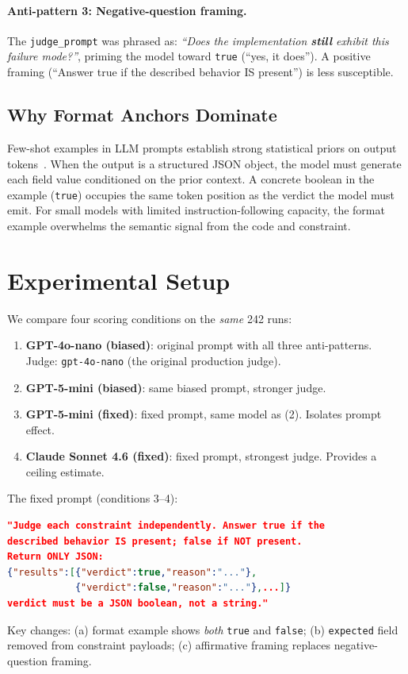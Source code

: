 \documentclass[11pt]{article}
\begin{document}
\paragraph{Anti-pattern 3: Negative-question framing.}
The \texttt{judge\_prompt} was phrased as:
\textit{``Does the implementation \textbf{still} exhibit this failure
mode?''}, priming the model toward \texttt{true} (``yes, it does'').
A positive framing (``Answer true if the described behavior IS present'')
is less susceptible.

\subsection{Why Format Anchors Dominate}

Few-shot examples in LLM prompts establish strong statistical priors on
output tokens~\citep{brown2020language}.
When the output is a structured JSON object, the model must generate each
field value conditioned on the prior context.
A concrete boolean in the example (\texttt{true}) occupies the same
token position as the verdict the model must emit.
For small models with limited instruction-following capacity, the format
example overwhelms the semantic signal from the code and constraint.

\section{Experimental Setup}

We compare four scoring conditions on the \emph{same} 242 runs:

\begin{enumerate}
  \item \textbf{GPT-4o-nano (biased)}: original prompt with all three
        anti-patterns. Judge: \texttt{gpt-4o-nano} (the original
        production judge).
  \item \textbf{GPT-5-mini (biased)}: same biased prompt, stronger judge.
  \item \textbf{GPT-5-mini (fixed)}: fixed prompt, same model as (2).
        Isolates prompt effect.
  \item \textbf{Claude Sonnet 4.6 (fixed)}: fixed prompt, strongest judge.
        Provides a ceiling estimate.
\end{enumerate}

The fixed prompt (conditions 3--4):
\begin{lstlisting}[language=json, breaklines=true]
"Judge each constraint independently. Answer true if the
described behavior IS present; false if NOT present.
Return ONLY JSON:
{"results":[{"verdict":true,"reason":"..."},
            {"verdict":false,"reason":"..."},...]}
verdict must be a JSON boolean, not a string."
\end{lstlisting}
Key changes: (a) format example shows \emph{both} \texttt{true} and
\texttt{false}; (b) \texttt{expected} field removed from constraint
payloads; (c) affirmative framing replaces negative-question framing.
\end{document}
